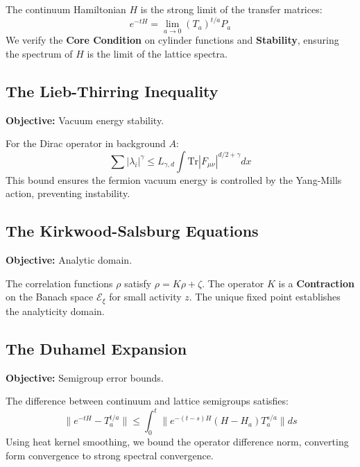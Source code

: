 \begin{theorem}
The continuum Hamiltonian $H$ is the strong limit of the transfer matrices:
\begin{equation}
e^{-tH} = \lim_{a \to 0} (T_a)^{t/a} P_a
\end{equation}
We verify the \textbf{Core Condition} on cylinder functions and \textbf{Stability}, ensuring the spectrum of $H$ is the limit of the lattice spectra.
\end{theorem}

\subsection{The Lieb-Thirring Inequality}
\textbf{Objective:} Vacuum energy stability.

\begin{theorem}
For the Dirac operator in background $A$:
\begin{equation}
\sum |\lambda_i|^\gamma \leq L_{\gamma, d} \int \text{Tr} |F_{\mu\nu}|^{d/2 + \gamma} dx
\end{equation}
This bound ensures the fermion vacuum energy is controlled by the Yang-Mills action, preventing instability.
\end{theorem}

\subsection{The Kirkwood-Salsburg Equations}
\textbf{Objective:} Analytic domain.

\begin{theorem}
The correlation functions $\rho$ satisfy $\rho = K \rho + \zeta$.
The operator $K$ is a \textbf{Contraction} on the Banach space $\mathcal{E}_\xi$ for small activity $z$. The unique fixed point establishes the analyticity domain.
\end{theorem}

\subsection{The Duhamel Expansion}
\textbf{Objective:} Semigroup error bounds.

\begin{theorem}
The difference between continuum and lattice semigroups satisfies:
\begin{equation}
\| e^{-tH} - T_a^{t/a} \| \leq \int_0^t \| e^{-(t-s)H} (H - H_a) T_a^{s/a} \| ds
\end{equation}
Using heat kernel smoothing, we bound the operator difference norm, converting form convergence to strong spectral convergence.
\end{theorem}

